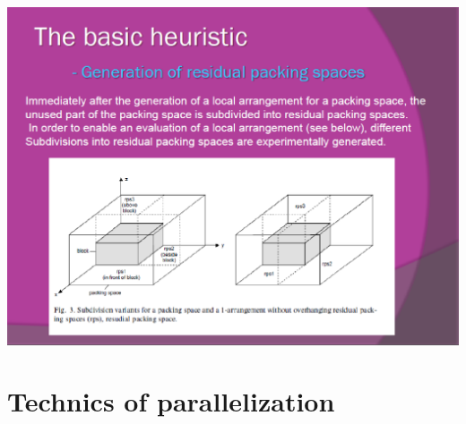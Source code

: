 \documentclass[spanish,a4paper,11pt,twoside]{report}
\begin{document}

\begin{center}
\includegraphics[width=1\textwidth]{images/picn7.eps}\\[0.25cm]
\end{center}

\chapter{Technics of parallelization}
\label{chapter:exp}
\end{document}
